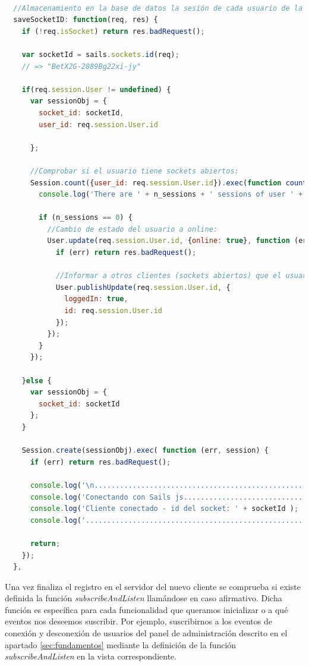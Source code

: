 \begin{lstlisting}[language=JavaScript]

  //Almacenamiento en la base de datos la sesión de cada usuario de la página:
  saveSocketID: function(req, res) {
    if (!req.isSocket) return res.badRequest();

    var socketId = sails.sockets.id(req);
    // => "BetX2G-2889Bg22xi-jy"

    if(req.session.User != undefined) {
      var sessionObj = {
        socket_id: socketId,
        user_id: req.session.User.id

      };

      //Comprobar si el usuario tiene sockets abiertos:
      Session.count({user_id: req.session.User.id}).exec(function countUserSessions(error, n_sessions) {
        console.log('There are ' + n_sessions + ' sessions of user ' + req.session.User.id);

        if (n_sessions == 0) {
          //Cambio de estado del usuario a online:
          User.update(req.session.User.id, {online: true}, function (err) {
            if (err) return res.badRequest();

            //Informar a otros clientes (sockets abiertos) que el usuario esta logueado:
            User.publishUpdate(req.session.User.id, {
              loggedIn: true,
              id: req.session.User.id
            });
          });
        }
      });

    }else {
      var sessionObj = {
        socket_id: socketId
      };
    }

    Session.create(sessionObj).exec( function (err, session) {
      if (err) return res.badRequest();

      console.log('\n..................................................');
      console.log('Conectando con Sails js.............................');
      console.log('Cliente conectado - id del socket: ' + socketId );
      console.log('....................................................');

      return;
    });
  },


\end{lstlisting}

Una vez finaliza el registro en el servidor del nuevo cliente se comprueba si existe definida la función \emph{ subscribeAndListen } llamándose en caso afirmativo. Dicha función es específica para cada
funcionalidad que queramos inicializar o a qué eventos nos deseemos suscribir. Por ejemplo, suscribirnos a los eventos de conexión y desconexión de usuarios del panel de administración descrito en el apartado
\ref{sec:fundamentos} mediante la definición de la función \emph{subscribeAndListen} en la vista correspondiente.\\


